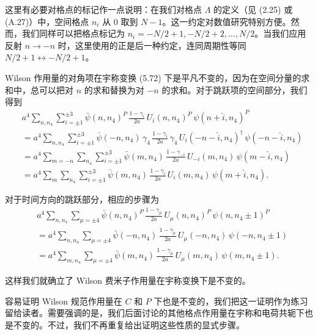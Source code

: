 这里有必要对格点的标记作一点说明：在我们对格点 $\Lambda$ 的定义（见 (2.25) 或 (A.27)）中，空间格点 $n_i$ 从 $0$ 取到 $N-1$。这一约定对数值研究特别方便。然而，我们同样可以把格点标记为 $n_i = -N/2+1, -N/2+2, \ldots, N/2$。当我们应用反射 $n \to -n$ 时，这里使用的正是后一种约定，连同周期性等同 $N/2 + 1 \leftrightarrow -N/2 + 1$。

Wilson 作用量的对角项在宇称变换 (5.72) 下是平凡不变的，因为在空间分量的求和中，总可以把对 $n$ 的求和替换为对 $-n$ 的求和。对于跳跃项的空间部分，我们得到
\begin{equation}
  \begin{aligned}
    &a^4\sum_{n,n_4}\sum_{i=\pm1}^{\pm3}\bar{\psi}(n,n_4)^P\,
      \frac{1-\gamma_i}{2a}\,U_i(n,n_4)^P\,\psi(n+\hat{i},n_4)^P\\
    &= a^4\sum_{n,n_4}\sum_{i=\pm1}^{\pm3}\bar{\psi}(-n,n_4)\,\gamma_4\,
      \frac{1-\gamma_i}{2a}\,\gamma_4\,U_i(-n-\hat{i},n_4)^\dagger\,
      \psi(-n-\hat{i},n_4)\\
    &= a^4\sum_{m=-n}\sum_{n_4}\sum_{i=\pm1}^{\pm3}\bar{\psi}(m,n_4)\,
      \frac{1-\gamma_{-i}}{2a}\,U_{-i}(m,n_4)\,\psi(m-\hat{i},n_4)\\
    &= a^4\sum_{m}\sum_{n_4}\sum_{i=\pm1}^{\pm3}\bar{\psi}(m,n_4)\,
      \frac{1-\gamma_i}{2a}\,U_i(m,n_4)\,\psi(m+\hat{i},n_4) .
  \end{aligned}
\end{equation}

对于时间方向的跳跃部分，相应的步骤为
\begin{equation}
  \begin{aligned}
    &a^4\sum_{n,n_4}\sum_{\mu=\pm4}\bar{\psi}(n,n_4)^P\,
      \frac{1-\gamma_\mu}{2a}\,U_\mu(n,n_4)^P\,\psi(n,n_4\pm1)^P\\
    &= a^4\sum_{n,n_4}\sum_{\mu=\pm4}\bar{\psi}(-n,n_4)\,
      \frac{1-\gamma_\mu}{2a}\,U_\mu(-n,n_4)\,\psi(-n,n_4\pm1)\\
    &= a^4\sum_{m,n_4}\sum_{\mu=\pm4}\bar{\psi}(m,n_4)\,
      \frac{1-\gamma_\mu}{2a}\,U_\mu(m,n_4)\,\psi(m,n_4\pm1) .
  \end{aligned}
\end{equation}

这样我们就确立了 Wilson 费米子作用量在宇称变换下是不变的。

容易证明 Wilson 规范作用量在 $C$ 和 $P$ 下也是不变的，我们把这一证明作为练习留给读者。需要强调的是，我们后面讨论的其他格点作用量在宇称和电荷共轭下也是不变的。不过，我们不再重复给出证明这些性质的显式步骤。

